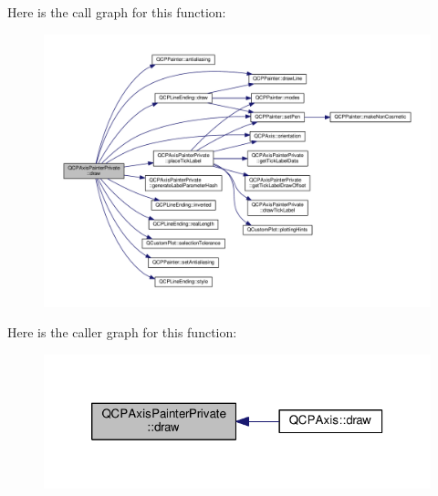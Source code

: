 Here is the call graph for this function\+:\nopagebreak
\begin{figure}[H]
\begin{center}
\leavevmode
\includegraphics[width=350pt]{class_q_c_p_axis_painter_private_a0207a99bdf9c4f70af20928898ddc2fc_cgraph}
\end{center}
\end{figure}




Here is the caller graph for this function\+:\nopagebreak
\begin{figure}[H]
\begin{center}
\leavevmode
\includegraphics[width=320pt]{class_q_c_p_axis_painter_private_a0207a99bdf9c4f70af20928898ddc2fc_icgraph}
\end{center}
\end{figure}


\hypertarget{class_q_c_p_axis_painter_private_ad8f2f12cd35b8189e8bf96679e873933}{}
